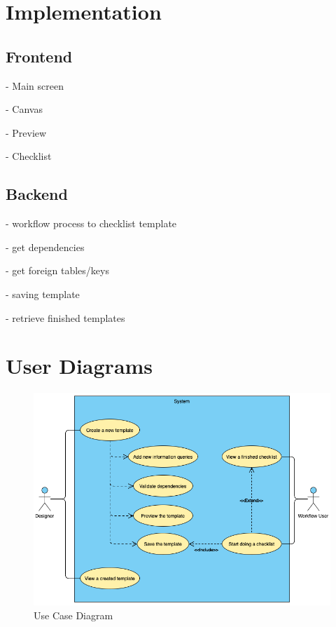 \section{Implementation}
\subsection{Frontend}
- Main screen

- Canvas

- Preview

- Checklist

\subsection{Backend}
- workflow process to checklist template

- get dependencies

- get foreign tables/keys

- saving template

- retrieve finished templates

\section{User Diagrams}

\begin{figure}[ht]
    \centering
    \includegraphics[width=\textwidth]{overleaf/images/use_case_diagram.png}
    \caption{Use Case Diagram}
    \label{fig:use_case_diagram}
\end{figure}
